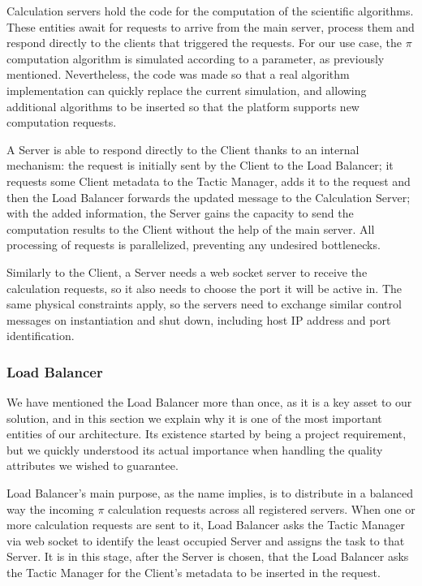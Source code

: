 \documentclass[12pt]{article}
\begin{document}
Calculation servers hold the code for the computation of the scientific algorithms.
These entities await for requests to arrive from the main server, process them and respond directly to the clients that triggered the requests.
For our use case, the $\pi$ computation algorithm is simulated according to a parameter, as previously mentioned.
Nevertheless, the code was made so that a real algorithm implementation can quickly replace the current simulation, and allowing additional algorithms to be
inserted so that the platform supports new computation requests.

A Server is able to respond directly to the Client thanks to an internal mechanism:
the request is initially sent by the Client to the Load Balancer;
it requests some Client metadata to the Tactic Manager, adds it to the request and then the Load Balancer forwards the updated message to the Calculation Server;
with the added information, the Server gains the capacity to send the computation results to the Client without the help of the main server.
All processing of requests is parallelized, preventing any undesired bottlenecks.

Similarly to the Client, a Server needs a web socket server to receive the calculation requests, so it also needs to choose the port it will be active in.
The same physical constraints apply, so the servers need to exchange similar control messages on instantiation and shut down, including host IP address and port identification.

\subsubsection{Load Balancer} \label{lb}

We have mentioned the Load Balancer more than once, as it is a key asset to our solution, and in this section we explain why it is one of the most important
entities of our architecture.
Its existence started by being a project requirement, but we quickly understood its actual importance when handling the quality attributes we wished to guarantee.

Load Balancer's main purpose, as the name implies, is to distribute in a balanced way the incoming $\pi$ calculation requests across all registered servers.
When one or more calculation requests are sent to it, Load Balancer asks the Tactic Manager via web socket to identify the least occupied Server and assigns the
task to that Server.
It is in this stage, after the Server is chosen, that the Load Balancer asks the Tactic Manager for the Client's metadata to be inserted in the request.
\end{document}
